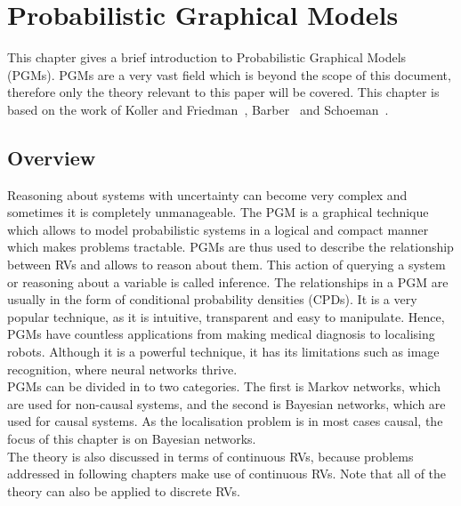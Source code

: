 \documentclass[12pt,oneside,openany,a4paper, %
afrikaans,english,
]{memoir}
\numberwithin{equation}{chapter}
\begin{document}
\chapter{Probabilistic Graphical Models}
This chapter gives a brief introduction to Probabilistic Graphical Models (PGMs). PGMs are a very vast field which is beyond the scope of this document, therefore only the theory relevant to this paper will be covered. This chapter is based on the work of Koller and Friedman~\cite{koller}, Barber~\cite{barber} and Schoeman~\citep{JC}.
\section{Overview}
Reasoning about systems with uncertainty can become very complex and sometimes it is completely unmanageable. The PGM is a graphical technique which allows to model probabilistic systems in a logical and compact manner which makes problems tractable. PGMs are thus used to describe the relationship between RVs and allows to reason about them. This action of querying a system or reasoning about a variable is called inference. The relationships in a PGM are usually in the form of conditional probability densities (CPDs). It is a very popular technique, as it is intuitive, transparent and easy to manipulate. Hence, PGMs have countless applications from making medical diagnosis to localising robots. Although it is a powerful technique, it has its limitations such as image recognition, where neural networks thrive.\\
PGMs can be divided in to two categories. The first is Markov networks, which are used for non-causal systems, and the second is Bayesian networks, which are used for causal systems. As the localisation problem is in most cases causal, the focus of this chapter is on Bayesian networks.\\
The theory is also discussed in terms of continuous RVs, because problems addressed in following chapters make use of continuous RVs. Note that all of the theory can also be applied to discrete RVs. 
\end{document}
